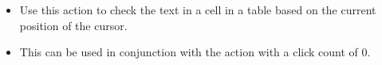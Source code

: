 
\begin{itemize}
\item Use this action to check the text in a cell in a table based on the current position of the cursor.
\item This can be used in conjunction with the action   with a click count of 0.  
\end{itemize}
